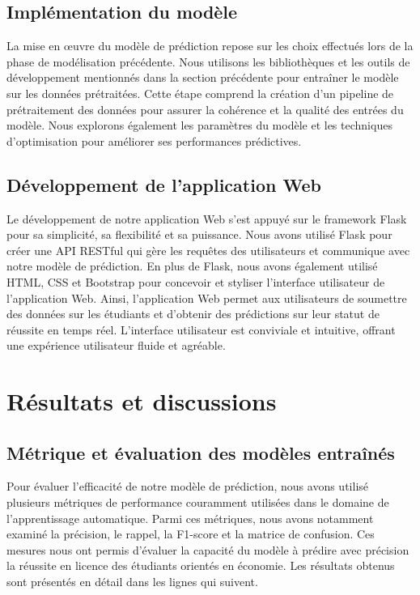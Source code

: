 \subsection{Implémentation du modèle}
 La mise en œuvre du modèle de prédiction repose sur les choix effectués lors de la phase de modélisation précédente. Nous utilisons les bibliothèques et les outils de développement mentionnés dans la section précédente pour entraîner le modèle sur les données prétraitées. Cette étape comprend la création d'un pipeline de prétraitement des données pour assurer la cohérence et la qualité des entrées du modèle. Nous explorons également les paramètres du modèle et les techniques d'optimisation pour améliorer ses performances prédictives.

\subsection{Développement de l’application Web} Le développement de notre application Web s'est appuyé sur le framework Flask pour sa simplicité, sa flexibilité et sa puissance. Nous avons utilisé Flask pour créer une API RESTful qui gère les requêtes des utilisateurs et communique avec notre modèle de prédiction. En plus de Flask, nous avons également utilisé HTML, CSS et Bootstrap pour concevoir et styliser l'interface utilisateur de l'application Web. Ainsi, l'application Web permet aux utilisateurs de soumettre des données sur les étudiants et d'obtenir des prédictions sur leur statut de réussite en temps réel. L'interface utilisateur est conviviale et intuitive, offrant une expérience utilisateur fluide et agréable.

\section{Résultats et discussions}

\subsection{Métrique et évaluation des modèles entraînés}
Pour évaluer l'efficacité de notre modèle de prédiction, nous avons utilisé plusieurs métriques de performance couramment utilisées dans le domaine de l'apprentissage automatique. Parmi ces métriques, nous avons notamment examiné la précision, le rappel, la F1-score et la matrice de confusion. Ces mesures nous ont permis d'évaluer la capacité du modèle à prédire avec précision la réussite en licence des étudiants orientés en économie. Les résultats obtenus sont présentés en détail dans les lignes qui suivent.


